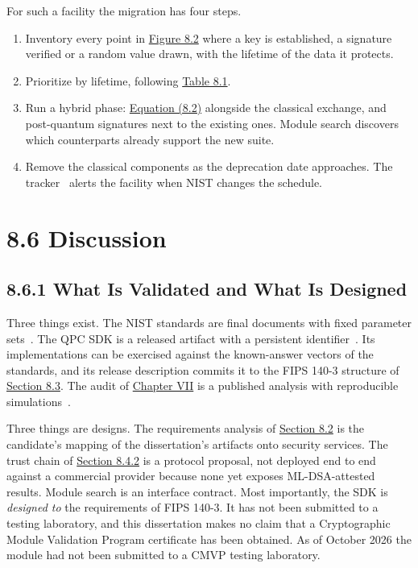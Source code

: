 \documentclass{report}
\theoremstyle{plain}
\theoremstyle{definition}
\theoremstyle{remark}
\begin{document}
For such a facility the migration has four steps.
\begin{enumerate}
\item Inventory every point in \hyperref[fig:pqc:stack]{Figure 8.2} where a key is established, a signature verified or a random value drawn, with the lifetime of the data it protects.
\item Prioritize by lifetime, following \hyperref[tab:pqc:assets]{Table 8.1}.
\item Run a hybrid phase: \hyperref[eq:pqc:hybrid]{Equation (8.2)} alongside the classical exchange, and post-quantum signatures next to the existing ones. Module search discovers which counterparts already support the new suite.
\item Remove the classical components as the deprecation date approaches. The tracker~\cite{guo2026nisttracker} alerts the facility when NIST changes the schedule.
\end{enumerate}

\section{8.6 Discussion}\label{sec:pqc:discussion}

\subsection{8.6.1 What Is Validated and What Is Designed}\label{sec:pqc:validated}

Three things exist. The NIST standards are final documents with fixed parameter sets~\cite{nist2024fips203,nist2024fips204,nist2024fips205}. The QPC SDK is a released artifact with a persistent identifier~\cite{guo2026lightriderqpc}. Its implementations can be exercised against the known-answer vectors of the standards, and its release description commits it to the FIPS 140-3 structure of \hyperref[sec:pqc:sdk]{Section 8.3}. The audit of \hyperref[ch:qec]{Chapter VII} is a published analysis with reproducible simulations~\cite{guo2026qecaudit}.

Three things are designs. The requirements analysis of \hyperref[sec:pqc:requirements]{Section 8.2} is the candidate's mapping of the dissertation's artifacts onto security services. The trust chain of \hyperref[sec:pqc:trustchain]{Section 8.4.2} is a protocol proposal, not deployed end to end against a commercial provider because none yet exposes ML-DSA-attested results. Module search is an interface contract. Most importantly, the SDK is \emph{designed to} the requirements of FIPS 140-3. It has not been submitted to a testing laboratory, and this dissertation makes no claim that a Cryptographic Module Validation Program certificate has been obtained. As of October 2026 the module had not been submitted to a CMVP testing laboratory.
\end{document}
